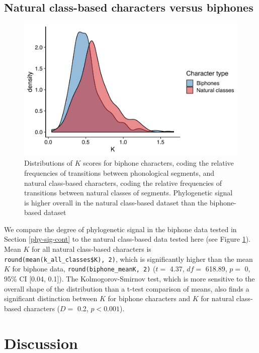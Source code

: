 \hypertarget{classes-vs-biphones}{%
\subsection{Natural class-based characters versus biphones}\label{classes-vs-biphones}}

\begin{figure}

{\centering \includegraphics[width=0.66\linewidth]{fig/k-biphones-classes} 

}

\caption{Distributions of $K$ scores for biphone characters, coding the relative frequencies of transitions between phonological segments, and natural class-based characters, coding the relative frequencies of transitions between natural classes of segments. Phylogenetic signal is higher overall in the natural class-based dataset than the biphone-based dataset}\label{fig:k-biphones-vs-features}
\end{figure}

We compare the degree of phylogenetic signal in the biphone data tested in Section \ref{phy-sig-cont} to the natural class-based data tested here (see Figure \ref{fig:k-biphones-vs-features}). Mean \(K\) for all natural class-based characters is \texttt{round(mean(k\_all\_classes\$K),\ 2)}, which is significantly higher than the mean \(K\) for biphone data, \texttt{round(biphone\_meanK,\ 2)} (\(t=\) 4.37, \(df=\) 618.89, \(p=\) 0, 95\% CI {[}0.04, 0.1{]}). The Kolmogorov-Smirnov test, which is more sensitive to the overall shape of the distribution than a t-test comparison of means, also finds a significant distinction between \(K\) for biphone characters and \(K\) for natural class-based characters (\(D=\) 0.2, \(p < 0.001\)).

\hypertarget{discussion}{%
\section{Discussion}\label{discussion}}

